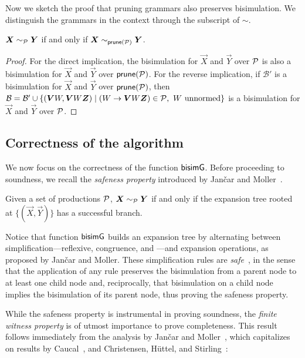 Now we sketch the proof that pruning grammars also preserves bisimulation.
We distinguish the grammars in the context through the subscript of $\sim$.

\begin{theorem}
	\label{thm:pruning_preserves_bisim}
	$\vec X \bisimP \vec Y$ if and only if $\vec X \sim_{\Prune(\productions)} \vec Y$.
\end{theorem}

\begin{proof}
For the direct implication, the bisimulation for $\vec X$ and $\vec Y$ over
$\mathcal P$ is also a bisimulation for $\vec X$ and $\vec Y$ over
$\mathsf{prune}(\mathcal P)$. For the reverse implication, if $\mathcal{B}'$
is a bisimulation for $\vec X$ and $\vec Y$ over $\mathsf{prune}(\mathcal P)$,
then $\mathcal{B} = \mathcal{B}' \cup 
\{(\vec V W, \vec V W \vec Z) \mid  (W\rightarrow \vec V W \vec Z) \in \productions, 
\text{ $W$ unnormed} \}$ 
is a bisimulation for $\vec X$ and $\vec Y$ over $\mathcal P$.
\end{proof}


\subsection{Correctness of the algorithm}

We now focus on the correctness of the function $\mathsf{bisimG}$.  Before
proceeding to soundness, we recall the \emph{safeness property}
introduced by Jan{\v{c}}ar and Moller~\cite{janvcar1999techniques}.

\begin{lemma} 
  \label{lem:safeness}
  Given a set of productions $\mathcal P$,
  $\vec X \ProdEquiv \vec Y$ if and only if the expansion tree rooted
  at $\{(\vec X, \vec Y)\}$ has a successful branch.
\end{lemma}

Notice that function $\mathsf{bisimG}$ builds an expansion tree by alternating
between simplification---reflexive, congruence, and \BPA---and
expansion operations, as proposed by Jan{\v{c}}ar and Moller.
%
These simplification rules are
\emph{safe}~\cite{janvcar1999techniques}, in the sense that the
application of any rule preserves the bisimulation from a parent node
to at least one child node and, reciprocally, that bisimulation on a
child node implies the bisimulation of its parent node, thus proving
the safeness property.

While the safeness property is instrumental in proving
soundness, the \emph{finite witness property} is of
utmost importance to prove completeness. This result follows
immediately from the analysis by Jan{\v{c}}ar and
Moller~\cite{janvcar1999techniques}, which capitalizes on results by
Caucal~\cite{caucal1986decidabilite}, and Christensen, H{\"{u}}ttel, and
Stirling~\cite{DBLP:journals/iandc/ChristensenHS95}:

